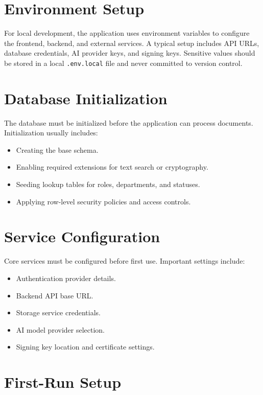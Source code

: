 \documentclass[12pt,oneside,openright,a4paper]{cpe-english-project}
\begin{document}
\section{Environment Setup}

For local development, the application uses environment variables to configure the frontend, backend, and external services. A typical setup includes API URLs, database credentials, AI provider keys, and signing keys. Sensitive values should be stored in a local \texttt{.env.local} file and never committed to version control.

\section{Database Initialization}

The database must be initialized before the application can process documents. Initialization usually includes:

\begin{itemize}
  \item Creating the base schema.
  \item Enabling required extensions for text search or cryptography.
  \item Seeding lookup tables for roles, departments, and statuses.
  \item Applying row-level security policies and access controls.
\end{itemize}

\section{Service Configuration}

Core services must be configured before first use. Important settings include:

\begin{itemize}
  \item Authentication provider details.
  \item Backend API base URL.
  \item Storage service credentials.
  \item AI model provider selection.
  \item Signing key location and certificate settings.
\end{itemize}

\section{First-Run Setup}
\end{document}
